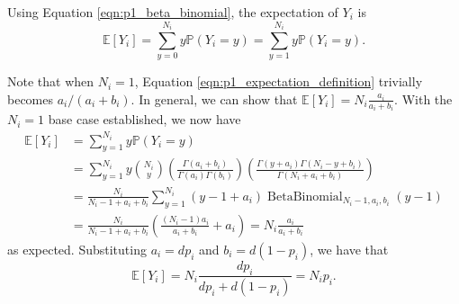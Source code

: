 \documentclass[letterpaper,11pt]{article}
\begin{document}
\begin{enumerate}
\begin{enumerate}
\begin{description}
      Using Equation \ref{eqn:p1_beta_binomial}, the expectation of $Y_i$ is
      \begin{equation}
        \mathbb{E}\left[Y_i\right]
        = \sum_{y=0}^{N_i}y\mathbb{P}\left(
        Y_i = y
          \right)
          = \sum_{y=1}^{N_i}y\mathbb{P}\left(
          Y_i = y
        \right).
        \label{eqn:p1_expectation_definition}
      \end{equation}

      Note that when $N_i = 1$, Equation \ref{eqn:p1_expectation_definition}
      trivially becomes $a_i/\left(a_i + b_i\right)$. In general, we can show
      that $\displaystyle\mathbb{E}\left[Y_i\right] = N_i\frac{a_i}{a_i +
        b_i}$. With the $N_i = 1$ base case established, we now have
        \begin{align}
          \mathbb{E}\left[Y_i\right]
        &= \sum_{y=1}^{N_i}y\mathbb{P}\left(Y_i = y\right) \nonumber\\
        &= \sum_{y=1}^{N_i} y {N_i \choose y}
          \left(
          \frac{\Gamma\left(a_i + b_i\right)}
          {\Gamma\left(a_i\right)\Gamma\left(b_i\right)}
          \right)
          \left(
          \frac{\Gamma\left(y + a_i\right)\Gamma\left(
          N_i - y + b_i
          \right)}
          {\Gamma\left(N_i + a_i + b_i\right)}
          \right) \nonumber\\
          &= \frac{N_i}{N_i - 1 + a_i + b_i} \sum_{y=1}^{N_i}
            \left(y - 1 + a_i\right)
            \operatorname{BetaBinomial}_{N_i - 1,a_i,b_i}
            \left(y - 1\right) \nonumber\\
        &= \frac{N_i}{N_i - 1 + a_i + b_i}
          \left(
          \frac{\left(N_i - 1\right)a_i}{a_i + b_i} + a_i
          \right) = N_i\frac{a_i}{a_i + b_i} 
          \label{eqn:p1_expectation_derivation}
        \end{align}
        \normalsize as expected. Substituting $a_i = dp_i$ and
        $b_i = d\left(1-p_i\right)$, we have that
      \begin{equation}
        \mathbb{E}\left[
          Y_i \right]
        = N_i\frac{dp_i}{dp_i + d\left(1 - p_i\right)}  = N_ip_i.
        \label{eqn:p1_expectation_substitution}
      \end{equation}
      

\end{description}
\end{enumerate}
\end{enumerate}
\end{document}
